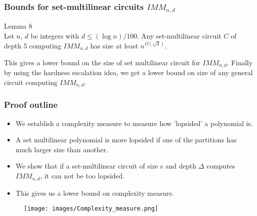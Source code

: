 \documentclass{beamer}
\begin{document}
\begin{frame}[allowframebreaks]
\frametitle{Bounds for set-multilinear circuits $IMM_{n,d}$}
\begin{exampleblock}{Lemma 8}\\
Let $n$, $d$ be integers with $d \leq (\log n)/100$. Any set-multilinear circuit $C$ of depth 5 computing $IMM_{n,d}$ has size at least $n^{\Omega(\sqrt{d})}$.
\end{exampleblock}
\vspace{1cm}
This gives a lower bound on the size of set multilinear circuit for  $IMM_{n,d}$. Finally by using the hardness escalation idea, we get a lower bound on size of any general circuit computing $IMM_{n,d}$.
\end{frame}

\begin{frame}[allowframebreaks]
\frametitle{Proof outline}
\begin{itemize}
    \item  We establish a complexity measure to measure how 'lopsided' a polynomial is. 
    \item A set multilinear polynomial is more lopsided if one of the partitions has much larger size than another. 
    \item We show that if a set-multilinear circuit of size s and depth $\Delta$ computes $IMM_{n,d}$, it can not be too lopsided. 
    \item This gives us a lower bound on complexity measure.
    
    
\end{itemize}
\begin{figure}[H]
    \centering
    \texttt{[image: images/Complexity\_measure.png]}
\end{figure}
\end{frame}
\end{document}
